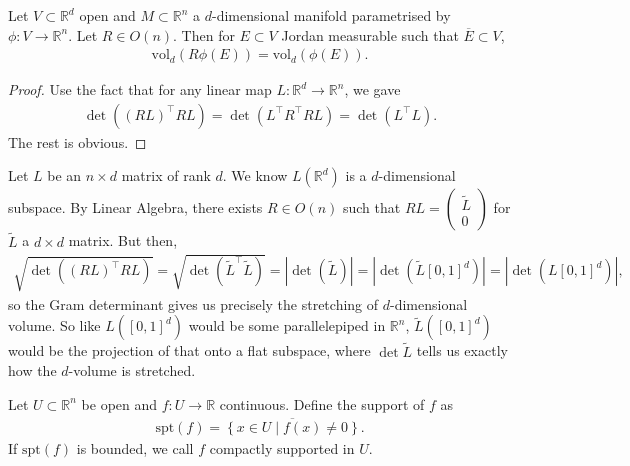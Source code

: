 \begin{lemma}\label{lem:inv-ortho-trans}
	Let $V \subset \mathbb{R}^{d}$ open and $M \subset \mathbb{R}^{n}$ a $d$-dimensional manifold parametrised by $\phi: V \to \mathbb{R}^{n}$. Let $R \in O(n)$. Then for $E \subset V$ Jordan measurable such that $\overline{ E } \subset V$,
	\begin{align*}
		\text{vol}_{d}(R \phi(E)) = \text{vol}_{d}(\phi(E)).
	\end{align*}
\end{lemma}
\begin{proof}
	Use the fact that for any linear map $L: \mathbb{R}^{d} \to \mathbb{R}^{n}$, we gave \begin{align*}
		\det ((RL)^\top RL) = \det (L^\top R^\top R L) = \det (L^\top L).
	\end{align*}
	The rest is obvious.
\end{proof}

\begin{remark}
	Let $L$ be an $n \times d$ matrix of rank $d$. We know $L( \mathbb{R}^{d})$ is a $d$-dimensional subspace. By Linear Algebra, there exists $R \in O(n)$ such that $RL = \begin{pmatrix} \widetilde{L} \\ 0 \end{pmatrix}$ for $\widetilde{L}$ a $d \times d$ matrix. But then,
	\begin{align*}
		\sqrt{\det ((RL)^\top RL)} = \sqrt{\det (\widetilde{L}^\top \widetilde{L})} = \left| \det (\widetilde{L}) \right| = \left| \det (\widetilde{L}[0,1]^{d}) \right| = \left| \det (L[0,1]^{d}) \right|,
	\end{align*}
	so the Gram determinant gives us precisely the stretching of $d$-dimensional volume. So like $L([0,1]^{d})$ would be some parallelepiped in $\mathbb{R}^{n}$, $\widetilde{L}([0,1]^{d})$ would be the projection of that onto a flat subspace, where $\det \widetilde{L}$ tells us exactly how the $d$-volume is stretched.
\end{remark}

\begin{definition}\label{def:support-func}
	Let $U \subset \mathbb{R}^{n}$ be open and $f: U \to \mathbb{R}$ continuous. Define the support of $f$ as
	\begin{align*}
		\text{spt}(f) = \overline{ \left\{ x \in U \mid f(x) \neq 0 \right\} }.
	\end{align*}
	If $\text{spt}(f)$ is bounded, we call $f$ compactly supported in $U$.
\end{definition}

